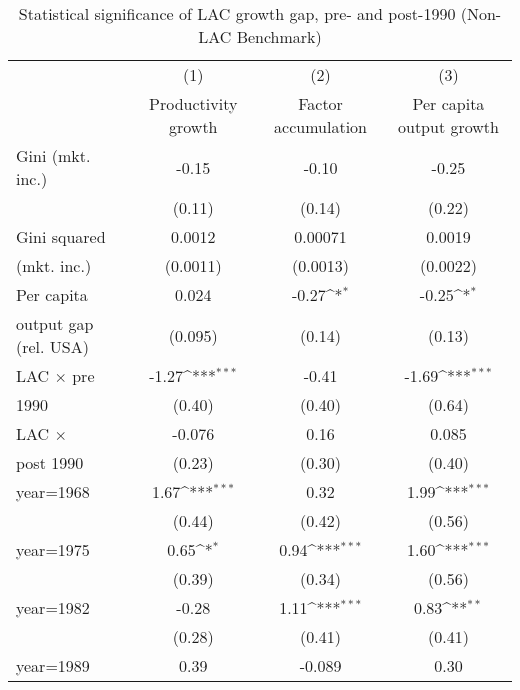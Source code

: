 \begin{sidewaystable}[htbp]\centering
\def\sym#1{\ifmmode^{#1}\else\(^{#1}\)\fi}
\caption{Statistical significance of LAC growth gap, pre- and post-1990 (Non-LAC Benchmark)}
\begin{tabular}{l*{3}{c}}
\toprule
                &\multicolumn{1}{c}{(1)}&\multicolumn{1}{c}{(2)}&\multicolumn{1}{c}{(3)}\\
                &\multicolumn{1}{c}{Productivity growth}&\multicolumn{1}{c}{Factor accumulation}&\multicolumn{1}{c}{Per capita output growth}\\
\midrule
Gini (mkt. inc.)&    -0.15         &    -0.10         &    -0.25         \\
                &   (0.11)         &   (0.14)         &   (0.22)         \\
\addlinespace
Gini squared    &   0.0012         &  0.00071         &   0.0019         \\
(mkt. inc.)     & (0.0011)         & (0.0013)         & (0.0022)         \\
\addlinespace
Per capita      &    0.024         &    -0.27\sym{*}  &    -0.25\sym{*}  \\
output gap (rel. USA)&  (0.095)         &   (0.14)         &   (0.13)         \\
\addlinespace
LAC $\times$ pre&    -1.27\sym{***}&    -0.41         &    -1.69\sym{***}\\
1990            &   (0.40)         &   (0.40)         &   (0.64)         \\
\addlinespace
LAC $\times$    &   -0.076         &     0.16         &    0.085         \\
post 1990       &   (0.23)         &   (0.30)         &   (0.40)         \\
\addlinespace
year=1968       &     1.67\sym{***}&     0.32         &     1.99\sym{***}\\
                &   (0.44)         &   (0.42)         &   (0.56)         \\
\addlinespace
year=1975       &     0.65\sym{*}  &     0.94\sym{***}&     1.60\sym{***}\\
                &   (0.39)         &   (0.34)         &   (0.56)         \\
\addlinespace
year=1982       &    -0.28         &     1.11\sym{***}&     0.83\sym{**} \\
                &   (0.28)         &   (0.41)         &   (0.41)         \\
\addlinespace
year=1989       &     0.39         &   -0.089         &     0.30         \\

\end{tabular}
\end{sidewaystable}
